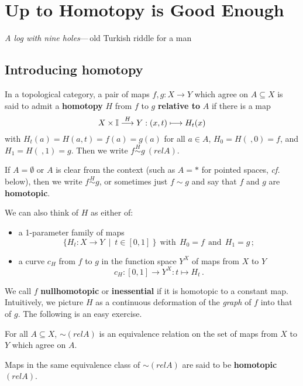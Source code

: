 \chapter{Up to Homotopy is Good Enough}\label{gdenuf}

\begin{center}
\small{\em A log with nine holes\/}---\,old Turkish riddle for a man
\end{center}

\section{Introducing homotopy}
In a topological category, a pair of maps   $f,g : X
\rightarrow Y $ which agree on  $A \subseteq X$  is said to admit a
{\bf homotopy} $H$ from $f$ to $g$ {\bf relative
to} $A$ if there is a
map
    $$ X\times \mathbb{ I} \stackrel{H}{\longrightarrow} Y : (x,t) \longmapsto H_{t}(x) $$
with
$H_t(a)=H(a,t) = f(a)=g(a)$ for all $a\in A$,
$H_0 = H(\ ,0) = f$, and $H_1 = H(\ ,1) = g$.
Then we write  $f\stackrel{H}\sim g \  (rel A)$.

If  $A = \emptyset$   or  $A$ is clear from the context (such as $A={\ast}$
for pointed spaces, {\em cf.} below), then we write   $f\stackrel{H}\sim g$,
or sometimes just $f\sim g$  and say that  $f$  and  $g$  are  {\bf
homotopic}.

We can also think of $H$  as either of:
\begin{itemize}
\item a 1-parameter family of maps
$$\{H_{t} : X \longrightarrow Y \ \mid \ t \in [0,1]\ \}\ \  \mbox{with}
\ \   H _{0} = f \ \ \mbox{and} \ \   H _{1} = g\, ;$$
\item  a curve  $c_{H}$   from   $f$   to $g$ in the function space   $Y^{X}$
 of maps from  $X$  to  $Y$
    $$ c_{H} : [0,1] \longrightarrow Y^X : t \longmapsto H_{t}\,. $$
\end{itemize}

We call   $f$  {\bf nullhomotopic} or  {\bf
inessential} if
it is homotopic to a constant map. Intuitively, we picture   $H$  as a
continuous deformation of the {\em graph\/} of  $f$  into that of  $g.$
The following is an easy exercise.
\begin{proposition}
For all  $A \subseteq X$, $\sim (rel A)$  is an
equivalence relation on the set of maps from  $X$  to  $Y$  which
agree on $A$.
\end{proposition}
Maps in the same equivalence class of   $\sim (rel A)$  are
said to be {\bf homotopic $(rel A)$}.

